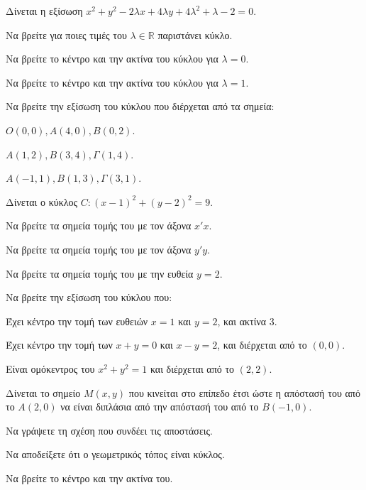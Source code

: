 \documentclass[11pt,a4paper,modern]{FFExercises}
\begin{document}
\askhsh
Δίνεται η εξίσωση $x^2 + y^2 - 2\lambda x + 4\lambda y + 4\lambda^2 + \lambda - 2 = 0$.
\begin{alist}
    \item Να βρείτε για ποιες τιμές του $\lambda \in \mathbb{R}$ παριστάνει κύκλο.
    \item Να βρείτε το κέντρο και την ακτίνα του κύκλου για $\lambda=0$.
    \item Να βρείτε το κέντρο και την ακτίνα του κύκλου για $\lambda=1$.
\end{alist}

\askhsh
Να βρείτε την εξίσωση του κύκλου που διέρχεται από τα σημεία:
\begin{alist}
    \item $O(0,0), A(4,0), B(0,2)$.
    \item $A(1,2), B(3,4), \Gamma(1,4)$.
    \item $A(-1,1), B(1,3), \Gamma(3,1)$.
\end{alist}

\askhsh
Δίνεται ο κύκλος $C: (x-1)^2 + (y-2)^2 = 9$.
\begin{alist}
    \item Να βρείτε τα σημεία τομής του με τον άξονα $x'x$.
    \item Να βρείτε τα σημεία τομής του με τον άξονα $y'y$.
    \item Να βρείτε τα σημεία τομής του με την ευθεία $y=2$.
\end{alist}

\askhsh
Να βρείτε την εξίσωση του κύκλου που:
\begin{alist}
    \item Έχει κέντρο την τομή των ευθειών $x=1$ και $y=2$, και ακτίνα 3.
    \item Έχει κέντρο την τομή των $x+y=0$ και $x-y=2$, και διέρχεται από το $(0,0)$.
    \item Είναι ομόκεντρος του $x^2+y^2=1$ και διέρχεται από το $(2,2)$.
\end{alist}

\askhsh
Δίνεται το σημείο $M(x,y)$ που κινείται στο επίπεδο έτσι ώστε η απόστασή του από το $A(2,0)$ να είναι διπλάσια από την απόστασή του από το $B(-1,0)$.
\begin{alist}
    \item Να γράψετε τη σχέση που συνδέει τις αποστάσεις.
    \item Να αποδείξετε ότι ο γεωμετρικός τόπος είναι κύκλος.
    \item Να βρείτε το κέντρο και την ακτίνα του.
\end{alist}
\end{document}
